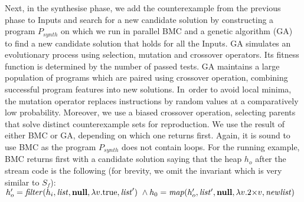 \documentclass[runningheads,a4paper]{llncs}
\begin{document}


Next, in the {\sc synthesise} phase, we add the counterexample from
the previous phase to Inputs and search for a new candidate solution
by constructing a program $P_\mathit{synth}$ on which we run in parallel BMC
and a genetic algorithm (GA) to find a new candidate solution that holds for
all the Inputs.  GA simulates an evolutionary process using selection,
mutation and crossover operators.  Its fitness function is determined by the
number of passed tests.  GA maintains a large population of programs which
are paired using crossover operation, combining successful program features
into new solutions.  In~order to avoid local minima, the mutation operator
replaces instructions by random values at a comparatively low probability. 
Moreover, we use a biased crossover operation, selecting parents that solve
distinct counterexample sets for reproduction.
%
We use the result of either BMC or GA, depending on which one returns first. 
Again, it is sound to use BMC as the program $P_\mathit{synth}$ does not
contain loops.  For the running example, BMC returns first with a candidate
solution saying that the heap $h_o$ after the stream code is the following
(for brevity, we omit the invariant which is very similar to $S_f$):
%
$ h_o' = \mathit{filter}(h_i, \mathit{list}, \mathbf{null}, \lambda v. \text{true}, \mathit{list}')~\wedge  h_0 = \mathit{map}(h_o', \mathit{list'}, \mathbf{null}, \lambda v.2 {\times} v, \mathit{newlist})$
\end{document}

